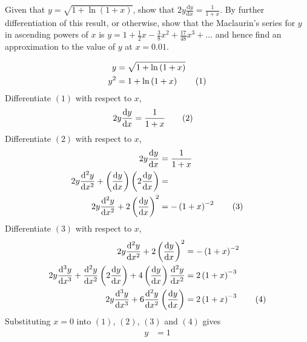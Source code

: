 \documentclass[11pt,a4paper]{book}
\begin{document}
\newpage

\begin{example}

Given that $y=\sqrt{1+\ln\left(1+x\right)}$, show that ${\displaystyle 2y\frac{\mathrm{d}y}{\mathrm{d}x}=\frac{1}{1+x}}$.
By further differentiation of this result, or otherwise, show that
the Maclaurin's series for $y$ in ascending powers of $x$ is ${\displaystyle y=1+\frac{1}{2}x-\frac{3}{8}x^{2}+\frac{17}{48}x^{3}+\ldots}$
and hence find an approximation to the value of $y$ at $x=0.01$.


\Solution

\begin{align*}
y & =\sqrt{1+\ln\left(1+x\right)}\\
y^{2} & =1+\ln\left(1+x\right)\tag{{1}}
\end{align*}
Differentiate $\left(1\right)$ with respect to $x$,
\begin{align*}
2y\frac{\mathrm{d}y}{\mathrm{d}x} & =\frac{1}{1+x}\tag{{2}}
\end{align*}
Differentiate $\left(2\right)$ with respect to $x$,
\begin{align*}
2y\frac{\mathrm{d}y}{\mathrm{d}x} & =\frac{1}{1+x}\\
2y\frac{\mathrm{d}^{2}y}{\mathrm{d}x^{2}}+\left(\frac{\mathrm{d}y}{\mathrm{d}x}\right)\left(2\frac{\mathrm{d}y}{\mathrm{d}x}\right) & =\\
2y\frac{\mathrm{d}^{2}y}{\mathrm{d}x^{2}}+2\left(\frac{\mathrm{d}y}{\mathrm{d}x}\right)^{2} & =-\left(1+x\right)^{-2}\tag{{3}}
\end{align*}
Differentiate $\left(3\right)$ with respect to $x$,
\begin{align*}
2y\frac{\mathrm{d}^{2}y}{\mathrm{d}x^{2}}+2\left(\frac{\mathrm{d}y}{\mathrm{d}x}\right)^{2} & =-\left(1+x\right)^{-2}\\
2y\frac{\mathrm{d}^{3}y}{\mathrm{d}x^{3}}+\frac{\mathrm{d}^{2}y}{\mathrm{d}x^{2}}\left(2\frac{\mathrm{d}y}{\mathrm{d}x}\right)+4\left(\frac{\mathrm{d}y}{\mathrm{d}x}\right)\frac{\mathrm{d}^{2}y}{\mathrm{d}x^{2}} & =2\left(1+x\right)^{-3}\\
2y\frac{\mathrm{d}^{3}y}{\mathrm{d}x^{3}}+6\frac{\mathrm{d}^{2}y}{\mathrm{d}x^{2}}\left(\frac{\mathrm{d}y}{\mathrm{d}x}\right) & =2\left(1+x\right)^{-3}\tag{{4}}
\end{align*}
Substituting $x=0$ into $\left(1\right)$, $\left(2\right)$, $\left(3\right)$
and $\left(4\right)$ gives
\begin{align*}
y & =1\\

\end{align*}
\end{example}
\end{document}

